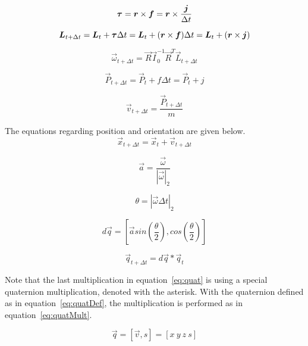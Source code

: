 \begin{equation}
  \boldsymbol{\tau} = \boldsymbol{r}\times\boldsymbol{f} = \boldsymbol{r}\times\frac{\boldsymbol{j}}{\Delta t}
\end{equation}

\begin{equation}
  \boldsymbol{L}_{t+\Delta t} = \boldsymbol{L}_t + \boldsymbol\tau \Delta t = \boldsymbol{L}_t +(\boldsymbol{r}\times\boldsymbol{f})\Delta t = \boldsymbol{L}_t + (\boldsymbol{r}\times\boldsymbol{j})
\end{equation}

\begin{equation}
  \vec{\omega}_{t+\Delta t} = \vec{R}\vec{I}_0^{-1}\vec{R}^T\vec{L}_{t+\Delta t}
\end{equation}

\begin{equation}
  \vec{P}_{t+\Delta t} = \vec{P}_t + f\Delta t =\vec{P}_t+j
\end{equation}

\begin{equation}
  \vec{v}_{t+\Delta t} = \frac{\vec{P}_{t+\Delta t}}{m}
\end{equation}

The equations regarding position and orientation are given below.
\begin{equation}
  \vec{x}_{t+\Delta t} = \vec{x}_t+\vec{v}_{t+\Delta t}
\end{equation}

\begin{equation}
  \vec{a} = \frac{\vec{\omega}}{|\vec{\omega}|_2}
\end{equation}

\begin{equation}
  \theta = |\vec{\omega}\Delta t|_2
\end{equation}

\begin{equation}
  d\vec{q} = [\vec{a} sin(\frac{\theta}{2}),cos(\frac{\theta}{2})]
\end{equation}

\begin{equation}\label{eq:quat}
  \vec{q}_{t+\Delta t} = d\vec{q}*\vec{q}_t
\end{equation}

Note that the last multiplication in equation~\ref{eq:quat} is using a special quaternion multiplication, denoted with the asterisk.
With the quaternion defined as in equation~\ref{eq:quatDef}, the multiplication is performed as in equation~\ref{eq:quatMult}.

\begin{equation}\label{eq:quatDef}
  \vec{q} = [\vec{v},s] = [x\ y\ z\ s]
\end{equation}

